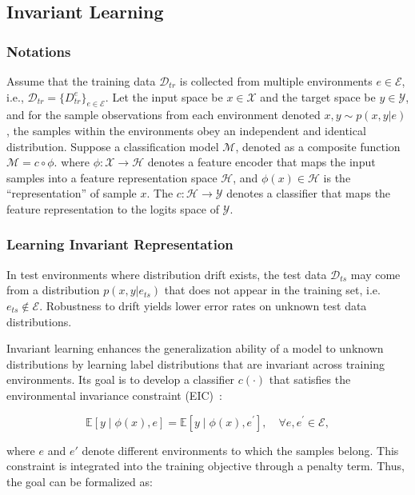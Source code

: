\subsection{Invariant Learning}
\label{invariant_learning}
\subsubsection{Notations}
Assume that the training data $\mathcal{D}_{tr}$ is collected from multiple environments $e \in \mathcal{E}$, i.e., $\mathcal{D}_{tr}=\{D^e_{tr}\}_{e \in \mathcal{E}}$. Let the input space be $x \in \mathcal{X}$ and the target space be $y \in \mathcal{Y}$, and for the sample observations from each environment denoted $x,y \sim p(x,y|e)$, the samples within the environments obey an independent and identical distribution. Suppose a classification model $\mathcal{M}$, denoted as a composite function $\mathcal{M}=c \circ \phi$. where $\phi:\mathcal{X} \rightarrow \mathcal{H}$ denotes a feature encoder that maps the input samples into a feature representation space $\mathcal{H}$, and $\phi(x) \in \mathcal{H}$ is the ``representation'' of sample $x$. The $c:\mathcal{H} \rightarrow \mathcal{Y}$ denotes a classifier that maps the feature representation to the logits space of $\mathcal{Y}$. 


\subsubsection{Learning Invariant Representation}
In test environments where distribution drift exists, the test data $\mathcal{D}_{ts}$ may come from a distribution $p(x,y|e_{ts})$ that does not appear in the training set, i.e. $e_{ts} \notin \mathcal{E}$. Robustness to drift yields lower error rates on unknown test data distributions.

Invariant learning enhances the generalization ability of a model to unknown distributions by learning label distributions that are invariant across training environments. Its goal is to develop a classifier $c(\cdot)$ that satisfies the environmental invariance constraint (EIC)~\cite{EIC}:

\begin{equation}
\mathbb{E}\left[y \mid \phi(x), e\right] = \mathbb{E}\left[y \mid \phi(x), e^{\prime}\right], \quad \forall e, e^{\prime} \in \mathcal{E},
\end{equation}

where $e$ and $e'$ denote different environments to which the samples belong. This constraint is integrated into the training objective through a penalty term. Thus, the goal can be formalized as:

